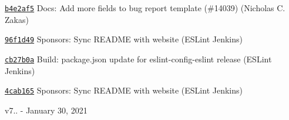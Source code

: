 \begin{DoxyItemize}
\item \href{https://github.com/eslint/eslint/commit/b4e2af5db1c29343ffec2cd104b04bf39b77ee56}{\texttt{ {\ttfamily b4e2af5}}} Docs\+: Add more fields to bug report template (\#14039) (Nicholas C. Zakas)
\item \href{https://github.com/eslint/eslint/commit/96f1d49a4647e59f2fb918be096654e290513adc}{\texttt{ {\ttfamily 96f1d49}}} Sponsors\+: Sync README with website (ESLint Jenkins)
\item \href{https://github.com/eslint/eslint/commit/cb27b0abeda6dfee55dd43b9cbe12afad321f55d}{\texttt{ {\ttfamily cb27b0a}}} Build\+: package.\+json update for eslint-\/config-\/eslint release (ESLint Jenkins)
\item \href{https://github.com/eslint/eslint/commit/4cab165bf4e6e5e9f42a59a37a8ff2548c0af87d}{\texttt{ {\ttfamily 4cab165}}} Sponsors\+: Sync README with website (ESLint Jenkins)
\end{DoxyItemize}

v7.. -\/ January 30, 2021


